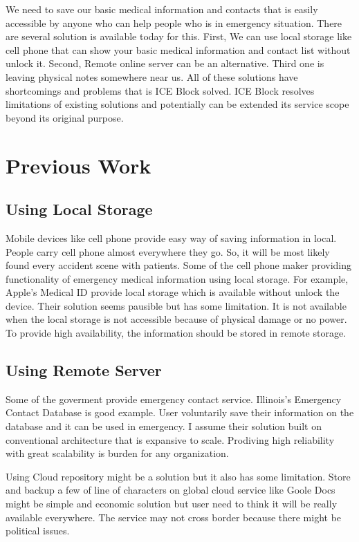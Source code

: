 \documentclass[conference]{IEEEtran}
\begin{document}
We need to save our basic medical information and contacts that is easily accessible by anyone who can help people who is in emergency situation.
There are several solution is available today for this.
First, We can use local storage like cell phone that can show your basic medical information and contact list without unlock it. 
Second, Remote online server can be an alternative.
Third one is leaving physical notes somewhere near us.
All of these solutions have shortcomings and problems that is ICE Block solved.
ICE Block resolves limitations of existing solutions and potentially can be extended its service scope
beyond its original purpose. 

\section{Previous Work}

\subsection{Using Local Storage}
Mobile devices like cell phone provide easy way of saving information in local.
People carry cell phone almost everywhere they go. So, it will be most likely found every accident scene with patients.
Some of the cell phone maker providing functionality of emergency medical information using local storage.
For example, Apple's Medical ID\cite{r1} provide local storage which is available without unlock the device.
Their solution seems pausible but has some limitation.
It is not available when the local storage is not accessible
because of physical damage or no power.
To provide high availability, the information should be stored in remote storage.

\subsection{Using Remote Server}
Some of the goverment provide emergency contact service. Illinois's Emergency Contact Database is good example.
User voluntarily save their information on the database and it can be used in emergency.
I assume their solution built on conventional architecture that is expansive to scale.
Prodiving high reliability with great scalability is burden for any organization.

Using Cloud repository might be a solution but it also has some limitation.
Store and backup a few of line of characters on global cloud service like Goole Docs might be simple and economic solution
but user need to think it will be really available everywhere.
The service may not cross border because there might be political issues.
\end{document}
